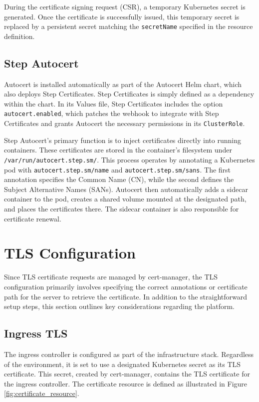 During the certificate signing request (CSR), a temporary Kubernetes secret is generated. Once the certificate is successfully issued, this temporary secret is replaced by a persistent secret matching the \texttt{secretName} specified in the resource definition.

\subsection{Step Autocert}
Autocert is installed automatically as part of the Autocert Helm chart, which also deploys Step Certificates. Step Certificates is simply defined as a dependency within the chart. In its Values file, Step Certificates includes the option \texttt{autocert.enabled}, which patches the webhook to integrate with Step Certificates and grants Autocert the necessary permissions in its \texttt{ClusterRole}.

Step Autocert's primary function is to inject certificates directly into running containers. These certificates are stored in the container's filesystem under \texttt{/var/run/autocert.step.sm/}. This process operates by annotating a Kubernetes pod with \texttt{autocert.step.sm/name} and \texttt{autocert.step.sm/sans}. The first annotation specifies the Common Name (CN), while the second defines the Subject Alternative Names (SANs). Autocert then automatically adds a sidecar container to the pod, creates a shared volume mounted at the designated path, and places the certificates there. The sidecar container is also responsible for certificate renewal.

\section{TLS Configuration} 
Since TLS certificate requests are managed by cert-manager, the TLS configuration primarily involves specifying the correct annotations or certificate path for the server to retrieve the certificate. In addition to the straightforward setup steps, this section outlines key considerations regarding the platform.

\subsection{Ingress TLS} 
The ingress controller is configured as part of the infrastructure stack. Regardless of the environment, it is set to use a designated Kubernetes secret as its TLS certificate. This secret, created by cert-manager, contains the TLS certificate for the ingress controller. The certificate resource is defined as illustrated in Figure \ref{fig:certificate_resource}.

